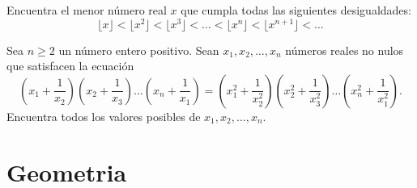 \documentclass[11pt]{scrartcl}
\begin{document}
\begin{problem}
[2016/3] Encuentra el menor número real $x$ que cumpla todas las siguientes desigualdades: 
$$\lfloor x \rfloor < \lfloor x^2 \rfloor <\lfloor x^3 \rfloor < \ldots < \lfloor x^n \rfloor < \lfloor x^{n+1} \rfloor <\ldots$$
\end{problem}

\begin{problem}
[2020/6] 
    Sea $n\ge 2$ un número entero positivo. Sean $x_1, x_2, \dots, x_n$ números reales no nulos que satisfacen la ecuación
\[\left(x_1+\frac{1}{x_2}\right)\left(x_2+\frac{1}{x_3}\right)\dots\left(x_n+\frac{1}{x_1}\right)=\left(x_1^2+\frac{1}{x_2^2}\right)\left(x_2^2+\frac{1}{x_3^2}\right)\dots\left(x_n^2+\frac{1}{x_1^2}\right). \]
Encuentra todos los valores posibles de $x_1, x_2, \dots, x_n$.
\end{problem}


\section{Geometria}
\end{document}
